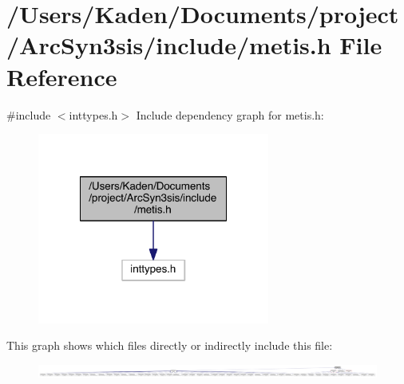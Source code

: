 \hypertarget{a00879}{}\section{/\+Users/\+Kaden/\+Documents/project/\+Arc\+Syn3sis/include/metis.h File Reference}
\label{a00879}
{\ttfamily \#include $<$inttypes.\+h$>$}\newline
Include dependency graph for metis.\+h\+:\nopagebreak
\begin{figure}[H]
\begin{center}
\leavevmode
\includegraphics[width=216pt]{a00880}
\end{center}
\end{figure}
This graph shows which files directly or indirectly include this file\+:\nopagebreak
\begin{figure}[H]
\begin{center}
\leavevmode
\includegraphics[width=350pt]{a00881}
\end{center}
\end{figure}
